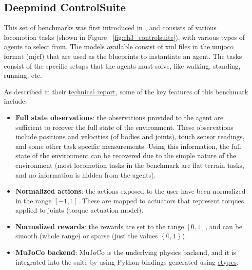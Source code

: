 \subsection{Deepmind ControlSuite}

This set of benchmarks was first introduced in \cite{Controlsuite}, and consists 
of various locomotion tasks (shown in Figure ~\ref{fig:ch3_controlsuite}), with various types of agents 
to select from. The models available consist of xml files in the mujoco format (mjcf) 
that are used as the blueprints to instantiate an agent. The tasks consist of the specific
setups that the agents must solve, like walking, standing, running, etc.

\figBenchmarkControlSuite

As described in their \href{https://arxiv.org/pdf/1801.00690.pdf}{technical report},
some of the key features of this benchmark include:

\begin{itemize}
    \item \textbf{Full state observations}: the observations provided to the agent
          are sufficient to recover the full state of the environment. These observations
          include positions and velocities (of bodies and joints), touch sensor readings,
          and some other task specific measurements. Using this information, the full state
          of the environment can be recovered due to the simple nature of the environment 
          (most locomotion tasks in the benchmark are flat terrain tasks, and no information
          is hidden from the agents).

    \item \textbf{Normalized actions}: the actions exposed to the user have been normalized 
          in the range $\left[-1,1\right]$. These are mapped to actuators that represent
          torques applied to joints (torque actuation model).

    \item \textbf{Normalized rewards}: the rewards are set to the range $\left[ 0, 1 \right]$, 
          and can be smooth (whole range) or sparse (just the values $\left\{0,1\right\}$).

    \item \textbf{MuJoCo backend}: MuJoCo is the underlying physics backend, and it is
          integrated into the suite by using Python bindings generated using 
          \href{https://github.com/deepmind/dm_control/blob/master/dm_control/autowrap/autowrap.py}{ctypes}.
\end{itemize}

